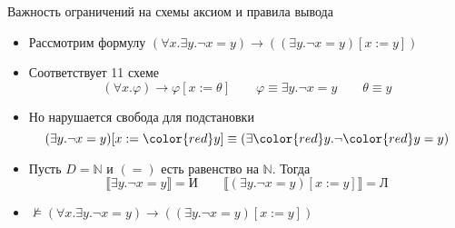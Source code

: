 \documentclass[aspectratio=169]{beamer}
\begin{document}
\begin{frame}{Важность ограничений на схемы аксиом и правила вывода}

\begin{itemize}
\item Рассмотрим формулу $(\forall x.\exists y.\neg x = y) \rightarrow ((\exists y.\neg x = y)[x := y])$\pause
\item Соответствует 11 схеме $$(\forall x.\varphi) \rightarrow \varphi[x:=\theta]\quad\quad\varphi \equiv \exists y.\neg x = y\quad\quad
\theta \equiv y$$\pause\vspace{-0.2cm}
\item Но нарушается свобода для подстановки 
$$(\exists y.\neg x = y)[x := {\color{red}y}] \equiv (\exists {\color{red}y}.\neg {\color{red}y} = y)$$\pause\vspace{-0.2cm}
\item Пусть $D = \mathbb{N}$ и $(=)$ есть равенство на $\mathbb{N}$. Тогда 
$$\llbracket\exists y.\neg x = y\rrbracket=\text{И}\quad\quad\llbracket(\exists y.\neg x = y) [x := y]\rrbracket = \text{Л}$$\pause\vspace{-0.2cm}
\item $\not\models (\forall x.\exists y.\neg x = y) \rightarrow ((\exists y.\neg x = y)[x := y])$
\end{itemize}
\end{frame}
\end{document}
